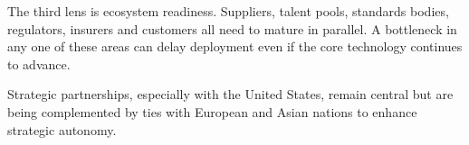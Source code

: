 \documentclass[10pt,a4paper]{article}
\begin{document}
{\small The third lens is ecosystem readiness. Suppliers, talent pools, standards bodies, regulators, insurers and customers all need to mature in parallel. A bottleneck in any one of these areas can delay deployment even if the core technology continues to advance.}\par
{}\par\vspace{1pt}
{\small Strategic partnerships, especially with the United States, remain central but are being complemented by ties with European and Asian nations to enhance strategic autonomy.}\par
\label{chap:2:end}
\end{document}
